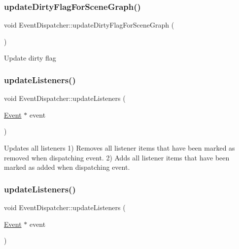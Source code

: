 \subsubsection{\texorpdfstring{update\+Dirty\+Flag\+For\+Scene\+Graph()}{updateDirtyFlagForSceneGraph()}\hspace{0.1cm}{\footnotesize\ttfamily [2/2]}}
{\footnotesize\ttfamily void Event\+Dispatcher\+::update\+Dirty\+Flag\+For\+Scene\+Graph (\begin{DoxyParamCaption}{ }\end{DoxyParamCaption})\hspace{0.3cm}{\ttfamily [protected]}}

Update dirty flag \mbox{\label{classEventDispatcher_a936a4600edda5168541a8ab42dd27056}} 
\subsubsection{\texorpdfstring{update\+Listeners()}{updateListeners()}\hspace{0.1cm}{\footnotesize\ttfamily [1/2]}}
{\footnotesize\ttfamily void Event\+Dispatcher\+::update\+Listeners (\begin{DoxyParamCaption}\item[{\hyperlink{classEvent}{Event} $\ast$}]{event }\end{DoxyParamCaption})\hspace{0.3cm}{\ttfamily [protected]}}

Updates all listeners 1) Removes all listener items that have been marked as \textquotesingle{}removed\textquotesingle{} when dispatching event. 2) Adds all listener items that have been marked as \textquotesingle{}added\textquotesingle{} when dispatching event. \mbox{\label{classEventDispatcher_a936a4600edda5168541a8ab42dd27056}} 
\subsubsection{\texorpdfstring{update\+Listeners()}{updateListeners()}\hspace{0.1cm}{\footnotesize\ttfamily [2/2]}}
{\footnotesize\ttfamily void Event\+Dispatcher\+::update\+Listeners (\begin{DoxyParamCaption}\item[{\hyperlink{classEvent}{Event} $\ast$}]{event }\end{DoxyParamCaption})\hspace{0.3cm}{\ttfamily [protected]}}

